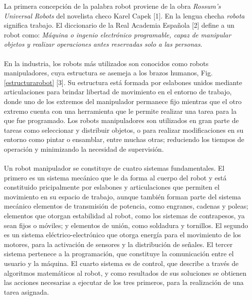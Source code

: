 \textcolor{Azul}La primera concepción de la palabra robot proviene de la obra \textit{Rossum's Universal Robots} del novelista checo Karel Capek [1]. En la lengua checha \textit{robota} significa trabajo. El diccionario de la Real Academia Española [2] define a un robot como: \textit{Máquina o ingenio electrónico programable, capaz de manipular objetos y realizar operaciones antes reservadas solo a las personas}. \\\\En la industria, los robots  más utilizados son conocidos como robots manipuladores, cuya estructura se asemeja a los brazos humanos, Fig. \ref{estructurarobot} [3]. Su estructura está formada por eslabones unidos mediante articulaciones para brindar libertad de movimiento en el entorno de trabajo, donde uno de los extremos del manipulador permanece fijo mientras que el otro extremo cuenta con una herramienta que le permite realizar una tarea para la que fue programado. Los robots manipuladores son utilizados en gran parte de tareas como seleccionar y distribuir objetos, o para realizar modificaciones en su entorno como pintar o ensamblar, entre muchas otras; reduciendo los tiempos de operación y minimizando la necesidad de supervisión.\\\\Un robot manipulador se constituye de cuatro sistemas fundamentales. El primero es un sistema mecánico que le da forma al cuerpo del robot y está constituido pricipalmente por eslabones y articulaciones que permiten el movimiento en su espacio de trabajo, aunque también forman parte del sistema mecánico elementos de transmisión de potencia, como engranes, cadenas y poleas; elementos que otorgan estabilidad al robot, como los sistemas de contrapesos, ya sean fijos o móviles; y elementos de unión, como soldadura y tornillos. El segundo es un sistema eléctrico-electrónico que otorga energía para el movimiento de los motores, para la activación de sensores y la distribución de señales. El tercer sistema pertenece a la programación, que constituye la comunicación entre el usuario y la máquina. El cuarto  sistema es de control, que describe a través de algoritmos matemáticos al robot, y como resultados de sus soluciones se obtienen las acciones necesarias a ejecutar de los tres primeros, para la realización de una tarea asignada.

